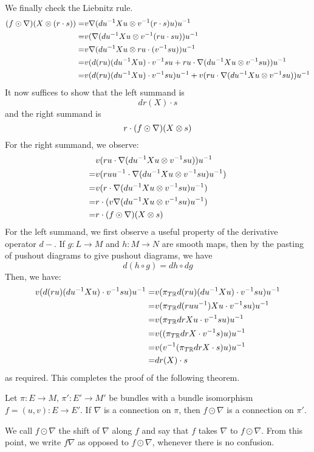 \documentclass[./Thick_TQFTs_and_Quantum_Information.tex]{subfiles}
\begin{document}
We finally check the Liebnitz rule.
\begin{align*}
(f \odot \nabla)(X \otimes (r \cdot s))
=& v\nabla(du^{-1}Xu \otimes v^{-1}(r \cdot s)u)u^{-1} \\
=& v(\nabla(du^{-1}Xu \otimes v^{-1}(ru \cdot su))u^{-1} \\
=& v\nabla(du^{-1}Xu \otimes ru \cdot (v^{-1}su))u^{-1} \\
=& v(
      d(ru)(du^{-1}Xu) \cdot v^{-1}su
      + ru \cdot \nabla(du^{-1}Xu \otimes v^{-1}su)
    )u^{-1} \\
=& v(d(ru)(du^{-1}Xu) \cdot v^{-1}su)u^{-1}
 + v(ru \cdot \nabla(du^{-1}Xu \otimes v^{-1}su))u^{-1}
\end{align*}
It now suffices to show that the left summand is
\[
  dr(X) \cdot s
\]
and the right summand is
\[
  r \cdot (f \odot \nabla)(X \otimes s)
\]
For the right summand, we observe:
\begin{align*}
 & v(ru \cdot \nabla(du^{-1}Xu \otimes v^{-1}su))u^{-1} \\
=& v(ruu^{-1} \cdot \nabla(du^{-1}Xu \otimes v^{-1}su)u^{-1}) \\
=& v(r \cdot \nabla(du^{-1}Xu \otimes v^{-1}su)u^{-1}) \\
=&r \cdot (v\nabla(du^{-1}Xu \otimes v^{-1}su)u^{-1}) \\
=& r \cdot (f \odot \nabla)(X \otimes s)
\end{align*}
For the left summand, we first observe a useful property of the derivative
operator $d-$. If $g : L \to M$ and $h : M \to N$ are smooth maps, then by the
pasting of pushout diagrams to give pushout diagrams, we have
\[
  d(h \circ g) = dh \circ dg
\]
Then, we have:
\begin{align*}
v(d(ru)(du^{-1}Xu) \cdot v^{-1}su)u^{-1}
=& v(\pi_{T\mathbb{R}}d(ru)(du^{-1}Xu) \cdot v^{-1}su)u^{-1}\\
=& v(\pi_{T\mathbb{R}}d(ruu^{-1})Xu \cdot v^{-1}su)u^{-1}\\
=& v(\pi_{T\mathbb{R}}drXu \cdot v^{-1}su)u^{-1}\\
=& v((\pi_{T\mathbb{R}}drX \cdot v^{-1}s)u)u^{-1}\\
=& v(v^{-1}(\pi_{T\mathbb{R}}drX \cdot s)u)u^{-1}\\
=& dr(X) \cdot s
\end{align*}
as required. This completes the proof of the following theorem.
\begin{thm}
Let $\pi : E \to M$, $\pi' : E' \to M'$ be bundles with a bundle isomorphism
$f = (u, v) : E \to E'$. If $\nabla$ is a connection on $\pi$, then
$f \odot \nabla$ is a connection on $\pi'$.
\end{thm}
\begin{defn}
We call $f \odot \nabla$ the shift of $\nabla$ along $f$ and say that $f$
takes $\nabla$ to $f \odot \nabla$. From this point, we write $f\nabla$ as
opposed to $f \odot \nabla$, whenever there is no confusion.
\end{defn}
\end{document}

